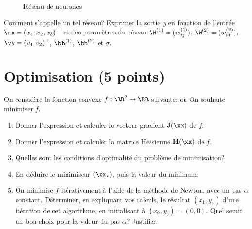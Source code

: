 \documentclass[11pt]{article}
\begin{document}
\begin{enumerate}
\begin{figure}[h!]
	\caption{Réseau de neurones}
	\label{fig:nn}
	\end{figure}
%

\noindent Comment s'appelle un tel réseau? Exprimer la sortie $y$ en fonction de l'entrée $\xx = (x_1,x_2,x_3)^\top$ et des paramètres du réseau $\W^{(1)} = (w_{ij}^{(1)})$, $\W^{(2)}=(w_{ij}^{(2)})$, $\vv = (v_1,v_2)^\top$, $\bb^{(1)}$, $\bb^{(2)}$ et $\sigma$.
\end{enumerate}

\section{Optimisation (5 points)}

On considère la fonction convexe $f: \RR^2\to \RR$ suivante:
où
On souhaite minimiser $f$.

\begin{enumerate}
	\item Donner l'expression et calculer le vecteur gradient $\mathbf{J}(\xx)$ de $f$.
	\item Donner l'expression et calculer la matrice Hessienne $\mathbf{H}(\xx)$ de $f$.
	\item Quelles sont les conditions d'optimalité du problème de minimisation?
	\item En déduire le minimiseur $(\xx_\star)$, puis la valeur du minimum.
	\item On minimise $f$ itérativement à l'aide de la méthode de Newton, avec un pas $\alpha$ constant. Déterminer, en expliquant vos calculs, le résultat $(x_1,y_1)$ d'une itération de cet algorithme, en initialisant à $(x_0,y_0) = (0,0)$. Quel serait un bon choix pour la valeur du pas $\alpha$?  Justifier.
\end{enumerate}
\end{document}
